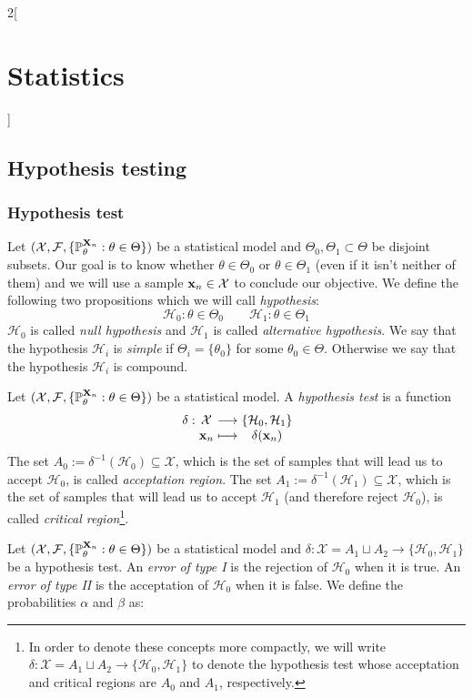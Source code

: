 \documentclass[../../../main.tex]{subfiles}
\begin{document}
\begin{multicols}{2}[\section{Statistics}]
  \subsection{Hypothesis testing}
  \subsubsection{Hypothesis test}
  \begin{definition}
    Let $(\mathcal{X},\mathcal{F},\{\mathbb{P}_\theta^{\boldsymbol{\mathrm{X}}_n}:\theta\in\Theta\})$ be a statistical model and $\Theta_0,\Theta_1\subset\Theta$ be disjoint subsets. Our goal is to know whether $\theta\in\Theta_0$ or $\theta\in\Theta_1$ (even if it isn't neither of them) and we will use a sample $\boldsymbol{\mathrm{x}}_n\in\mathcal{X}$ to conclude our objective. We define the following two propositions which we will call \emph{hypothesis}:
    $$\mathcal{H}_0:\theta\in\Theta_0\qquad\mathcal{H}_1:\theta\in\Theta_1$$
    $\mathcal{H}_0$ is called \emph{null hypothesis} and $\mathcal{H}_1$ is called \emph{alternative hypothesis}. We say that the hypothesis $\mathcal{H}_i$ is \emph{simple} if $\Theta_i=\{\theta_0\}$ for some $\theta_0\in\Theta$. Otherwise we say that the hypothesis $\mathcal{H}_i$ is compound.
  \end{definition}
  \begin{definition}
    Let $(\mathcal{X},\mathcal{F},\{\mathbb{P}_\theta^{\boldsymbol{\mathrm{X}}_n}:\theta\in\Theta\})$ be a statistical model. A \emph{hypothesis test} is a function $$\function{\delta}{\mathcal{X}}{\{\mathcal{H}_0,\mathcal{H}_1\}}{\vf{x}_n}{\delta(\vf{x}_n)}$$
    The set $A_0:=\delta^{-1}(\mathcal{H}_0)\subseteq \mathcal{X}$, which is the set of samples that will lead us to accept $\mathcal{H}_0$, is called \emph{acceptation region}. The set $A_1:=\delta^{-1}(\mathcal{H}_1)\subseteq \mathcal{X}$, which is the set of samples that will lead us to accept $\mathcal{H}_1$ (and therefore reject $\mathcal{H}_0$), is called \emph{critical region}\footnote{In order to denote these concepts more compactly, we will write $\delta:\mathcal{X}=A_1\sqcup A_2\rightarrow\{\mathcal{H}_0,\mathcal{H}_1\}$ to denote the hypothesis test whose acceptation and critical regions are $A_0$ and $A_1$, respectively.}.
  \end{definition}
  \begin{definition}
    Let $(\mathcal{X},\mathcal{F},\{\mathbb{P}_\theta^{\boldsymbol{\mathrm{X}}_n}:\theta\in\Theta\})$ be a statistical model and $\delta:\mathcal{X}=A_1\sqcup A_2\rightarrow\{\mathcal{H}_0,\mathcal{H}_1\}$ be a hypothesis test. An \emph{error of type I} is the rejection of $\mathcal{H}_0$ when it is true. An \emph{error of type II} is the acceptation of $\mathcal{H}_0$ when it is false. We define the probabilities $\alpha$ and $\beta$ as:

\end{definition}
\end{multicols}
\end{document}
